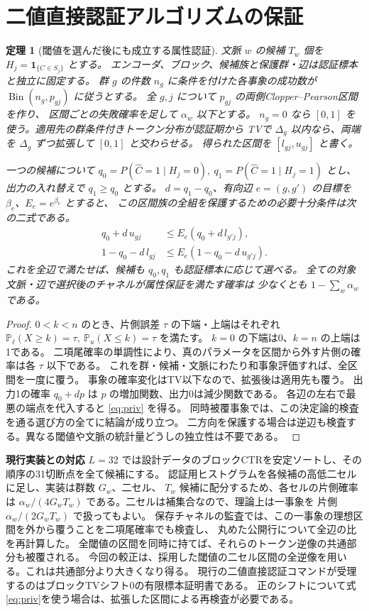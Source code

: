 \documentclass[a4paper,11pt]{ltjsarticle}
\theoremstyle{jp}
\newtheorem{thm}{定理}
\newcommand{\PP}{\mathbb P}
\newcommand{\ind}{\mathbf 1}
\newcommand{\cx}{\widehat C}
\newcommand{\para}[1]{\par\Needspace{3\baselineskip}\addvspace{.6\baselineskip}\noindent\textbf{#1}\enspace}
\begin{document}
\section{二値直接認証アルゴリズムの保証}

\begin{thm}[閾値を選んだ後にも成立する属性認証]\label{th:cert}
文脈 \(w\) の候補 \(T_w\) 個を \(H_j=\ind_{\{C\in S_j\}}\) とする。
エンコーダ、ブロック、候補族と保護群・辺は認証標本と独立に固定する。
群 \(g\) の件数 \(n_g\) に条件を付けた各事象の成功数が
\(\operatorname{Bin}(n_g,p_{gj})\) に従うとする。
全 \(g,j\) について \(p_{gj}\) の両側Clopper--Pearson区間を作り、
区間ごとの失敗確率を足して \(\alpha_w\) 以下とする。
\(n_g=0\) なら \([0,1]\) を使う。適用先の群条件付きトークン分布が認証期から
TVで \(\Delta_g\) 以内なら、両端を \(\Delta_g\) ずつ拡張して \([0,1]\) と交わらせる。
得られた区間を \([l_{gj},u_{gj}]\) と書く。

一つの候補について \(q_0=P(\cx=1\mid H_j=0),\
q_1=P(\cx=1\mid H_j=1)\) とし、出力の入れ替えで \(q_1\ge q_0\) とする。
\(d=q_1-q_0\)、有向辺 \(e=(g,g')\) の目標を \(\beta_e\)、\(E_e=e^{\beta_e}\) とすると、
この区間族の全組を保護するための必要十分条件は次の二式である。
\begin{align}
 q_0+d\,u_{gj}&\le E_e(q_0+d\,l_{g'j}),\nonumber\\
 1-q_0-d\,l_{gj}&\le E_e(1-q_0-d\,u_{g'j}). \tag{3}\label{eq:priv}
\end{align}
これを全辺で満たせば、候補も \(q_0,q_1\) も認証標本に応じて選べる。
全ての対象文脈・辺で選択後のチャネルが属性保証を満たす確率は
少なくとも \(1-\sum_w\alpha_w\) である。
\end{thm}
\begin{proof}
\(0<k<n\) のとき、片側誤差 \(\tau\) の下端・上端はそれぞれ
\(\PP_{\ell}(X\ge k)=\tau,\ \PP_u(X\le k)=\tau\) を満たす。
\(k=0\) の下端は0、\(k=n\) の上端は1である。
二項尾確率の単調性により、真のパラメータを区間から外す片側の確率は各 \(\tau\) 以下である。
これを群・候補・文脈にわたり和事象評価すれば、全区間を一度に覆う。
事象の確率変化はTV以下なので、拡張後は適用先も覆う。
出力1の確率 \(q_0+dp\) は \(p\) の増加関数、出力0は減少関数である。
各辺の左右で最悪の端点を代入すると \eqref{eq:priv} を得る。
同時被覆事象では、この決定論的検査を通る選び方の全てに結論が成り立つ。
二方向を保護する場合は逆辺も検査する。異なる閾値や文脈の統計量どうしの独立性は不要である。
\cite{cp}
\end{proof}

\para{現行実装との対応}
\(L=32\) では設計データのブロックCTRを安定ソートし、その順序の31切断点を全て候補にする。
認証用ヒストグラムを各候補の高低二セルに足し、実装は群数 \(G_w\)、二セル、
\(T_w\) 候補に配分するため、各セルの片側確率は
\(\alpha_w/(4G_w T_w)\) である。二セルは補集合なので、理論上は一事象を
片側 \(\alpha_w/(2G_wT_w)\) で扱ってもよい。
保存チャネルの監査では、この一事象の理想区間を外から覆うことを二項尾確率でも検査し、
丸めた公開行について全辺の比を再計算した。
全閾値の区間を同時に持てば、それらのトークン逆像の共通部分も被覆される。
今回の較正は、採用した閾値の二セル区間の全逆像を用いる。これは共通部分より大きくなり得る。
現行の二値直接認証コマンドが受理するのはブロックTVシフト0の有限標本証明書である。
正のシフトについて式\eqref{eq:priv}を使う場合は、拡張した区間による再検査が必要である。
\end{document}
